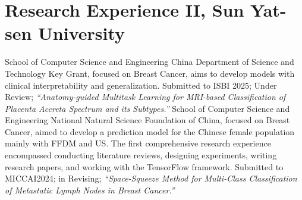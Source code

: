 \documentclass[11pt,a4paper, final]{moderncv}
\newcommand{\spacesubsection}{\vspace{0.2cm}}
\begin{document}
\section{\textbf{Research Experience II}, Sun Yat-sen University}
	{}{}{School of Computer Science and Engineering}
	{China Department of Science and Technology Key Grant, focused on Breast Cancer, 
	aims to develop models with clinical interpretability and generalization.}
	{Submitted to ISBI 2025; Under Review; 
	\emph{“Anatomy-guided Multitask Learning for MRI-based Classification of Placenta Accreta Spectrum and its Subtypes.”}}
    \spacesubsection
	{}{}{School of Computer Science and Engineering}
	{National Natural Science Foundation of China, focused on Breast Cancer, 
	aimed to develop a prediction model for the Chinese female population mainly with FFDM and US.}
	{The first comprehensive research experience encompassed conducting literature reviews, designing experiments, 
	writing research papers, and working with the TensorFlow framework.}
	{Submitted to MICCAI2024; in Revising; 
	\emph{“Space-Squeeze Method for Multi-Class Classification of Metastatic Lymph Nodes in Breast Cancer.”}}
\end{document}
